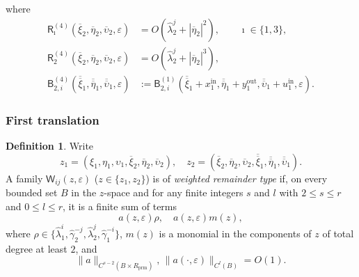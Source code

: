 \documentclass[11pt,a4paper]{article}
\theoremstyle{plain}
\theoremstyle{definition}
\newtheorem{definition}[theorem]{Definition}
\newtheorem{remark}[theorem]{Remark}
\theoremstyle{plain}
\numberwithin{equation}{section}
\begin{document}
where
\begin{equation}
\label{eq-SLGshilsub}
\begin{aligned}
\mathsf{R}_\imath^{(4)}(\overline{\xi}_2,\overline{\eta}_2,\overline{\upsilon}_2,\varepsilon)
&=
O(\widehat{\lambda}_2^j + |\overline{\eta}_2|^2),
\qquad
\imath \in \{1,3\},
\\
\mathsf{R}_2^{(4)}(\overline{\xi}_2,\overline{\eta}_2,\overline{\upsilon}_2,\varepsilon)
&=
O(\widehat{\lambda}_2^j + |\overline{\eta}_2|^3),
\\
\mathsf{B}_{2,i}^{(4)}(\overline{\overline{\xi}}_1,\overline{\overline{\eta}}_1,\overline{\overline{\upsilon}}_1,\varepsilon)
&:=
\mathsf{B}_{2,i}^{(1)}(\overline{\overline{\xi}}_1 + x_1^\mathrm{in},\overline{\overline{\eta}}_1 + y_1^\mathrm{out},\overline{\overline{\upsilon}}_1 + u_1^\mathrm{in},\varepsilon).
\end{aligned}
\end{equation}

\subsubsection{First translation}

\begin{definition}
\label{def-weighted-remainder}
Write
\[
z_1 = (\xi_1,\eta_1,\upsilon_1,\overline{\xi}_2,\overline{\eta}_2,\overline{\upsilon}_2), \quad z_2 = (\overline{\xi}_2,\overline{\eta}_2,\overline{\upsilon}_2,\overline{\overline{\xi}}_1,\overline{\overline{\eta}}_1,\overline{\overline{\upsilon}}_1).
\]
A family $\mathsf{W}_{ij}(z,\varepsilon)$ ($z \in \{z_1, z_2\}$) is of \emph{weighted remainder type} if, on every bounded set $B$ in the $z$-space and for any finite integers $s$ and $l$ with $2 \le s \le r$ and $0 \le l \le r$, it is a finite sum of terms
\[
a(z,\varepsilon)\rho, \quad a(z,\varepsilon)m(z),
\]
where $\rho \in \{\widehat{\lambda}_1^i,\widehat{\gamma}_2^{-j},\widehat{\lambda}_2^j,\widehat{\gamma}_1^{-i}\}$, $m(z)$ is a monomial  in the components of $z$ of total degree at least $2$, and
\[
\|a\|_{C^{s-2}(B \times R_\mathrm{prm})}, \, \|a(\cdot, \varepsilon)\|_{C^l(B)} = O(1).
\]
\end{definition}

\end{document}
